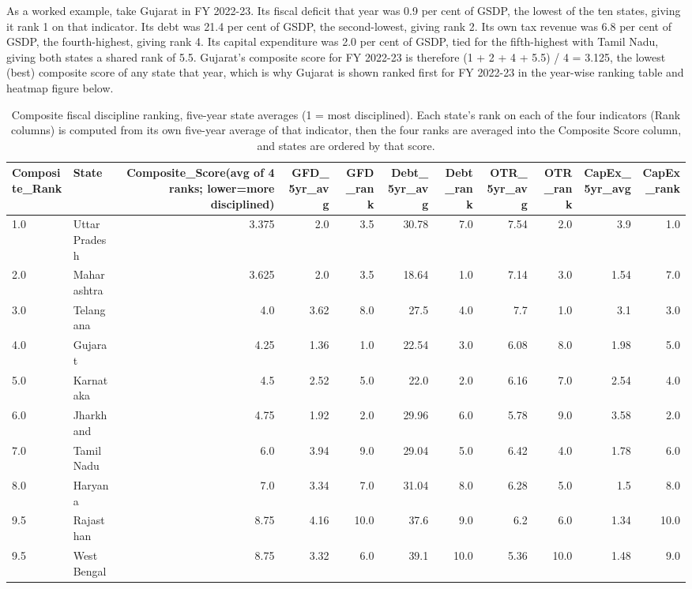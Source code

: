 \documentclass[12pt,a4paper]{article}
\begin{document}
As a worked example, take Gujarat in FY 2022-23. Its fiscal deficit that year was 0.9 per cent of GSDP, the lowest of the ten states, giving it rank 1 on that indicator. Its debt was 21.4 per cent of GSDP, the second-lowest, giving rank 2. Its own tax revenue was 6.8 per cent of GSDP, the fourth-highest, giving rank 4. Its capital expenditure was 2.0 per cent of GSDP, tied for the fifth-highest with Tamil Nadu, giving both states a shared rank of 5.5. Gujarat's composite score for FY 2022-23 is therefore (1 + 2 + 4 + 5.5) / 4 = 3.125, the lowest (best) composite score of any state that year, which is why Gujarat is shown ranked first for FY 2022-23 in the year-wise ranking table and heatmap figure below.

\setcounter{table}{14}
\begin{table}[H]
\centering
\caption{Composite fiscal discipline ranking, five-year state averages (1 = most disciplined). Each state's rank on each of the four indicators (Rank columns) is computed from its own five-year average of that indicator, then the four ranks are averaged into the Composite Score column, and states are ordered by that score.}
\label{tab:15}
\footnotesize
\begin{adjustbox}{max width=\textwidth}
\begin{tabular}{@{}llrrrrrrrrr@{}}
\toprule
Composite\_Rank & State & Composite\_Score(avg of 4 ranks; lower=more disciplined) & GFD\_5yr\_avg & GFD\_rank & Debt\_5yr\_avg & Debt\_rank & OTR\_5yr\_avg & OTR\_rank & CapEx\_5yr\_avg & CapEx\_rank \\
\midrule
1.0 & Uttar Pradesh & 3.375 & 2.0 & 3.5 & 30.78 & 7.0 & 7.54 & 2.0 & 3.9 & 1.0 \\
2.0 & Maharashtra & 3.625 & 2.0 & 3.5 & 18.64 & 1.0 & 7.14 & 3.0 & 1.54 & 7.0 \\
3.0 & Telangana & 4.0 & 3.62 & 8.0 & 27.5 & 4.0 & 7.7 & 1.0 & 3.1 & 3.0 \\
4.0 & Gujarat & 4.25 & 1.36 & 1.0 & 22.54 & 3.0 & 6.08 & 8.0 & 1.98 & 5.0 \\
5.0 & Karnataka & 4.5 & 2.52 & 5.0 & 22.0 & 2.0 & 6.16 & 7.0 & 2.54 & 4.0 \\
6.0 & Jharkhand & 4.75 & 1.92 & 2.0 & 29.96 & 6.0 & 5.78 & 9.0 & 3.58 & 2.0 \\
7.0 & Tamil Nadu & 6.0 & 3.94 & 9.0 & 29.04 & 5.0 & 6.42 & 4.0 & 1.78 & 6.0 \\
8.0 & Haryana & 7.0 & 3.34 & 7.0 & 31.04 & 8.0 & 6.28 & 5.0 & 1.5 & 8.0 \\
9.5 & Rajasthan & 8.75 & 4.16 & 10.0 & 37.6 & 9.0 & 6.2 & 6.0 & 1.34 & 10.0 \\
9.5 & West Bengal & 8.75 & 3.32 & 6.0 & 39.1 & 10.0 & 5.36 & 10.0 & 1.48 & 9.0 \\
\bottomrule
\end{tabular}
\end{adjustbox}
\end{table}
\end{document}
